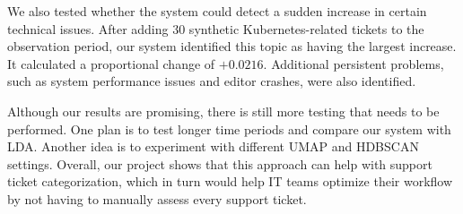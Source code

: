 \documentclass[sigconf,nonacm]{acmart}
\begin{document}
We also tested whether the system could detect a sudden increase in certain technical issues. After adding 30 synthetic Kubernetes-related tickets to the observation period, our system identified this topic as having the largest increase. It calculated a proportional change of $+0.0216$. Additional persistent problems, such as system performance issues and editor crashes, were also identified.

Although our results are promising, there is still more testing that needs to be performed. One plan is to test longer time periods and compare our system with LDA. Another idea is to experiment with different UMAP and HDBSCAN settings. Overall, our project shows that this approach can help with support ticket categorization, which in turn would help IT teams optimize their workflow by not having to manually assess every support ticket.


\balance

\end{document}
